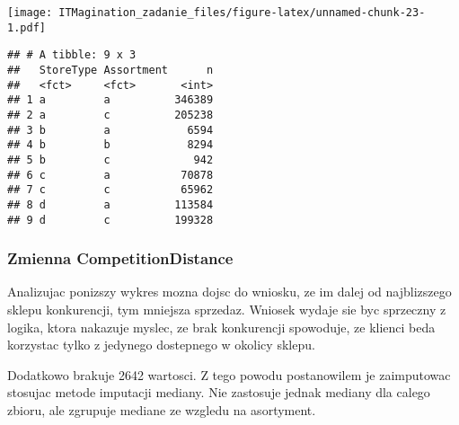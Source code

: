 \documentclass[]{article}
\newenvironment{Shaded}{\begin{snugshade}}{\end{snugshade}}
\newcommand{\DataTypeTok}[1]{\textcolor[rgb]{0.13,0.29,0.53}{#1}}
\newcommand{\FloatTok}[1]{\textcolor[rgb]{0.00,0.00,0.81}{#1}}
\newcommand{\KeywordTok}[1]{\textcolor[rgb]{0.13,0.29,0.53}{\textbf{#1}}}
\newcommand{\NormalTok}[1]{#1}
\newcommand{\OperatorTok}[1]{\textcolor[rgb]{0.81,0.36,0.00}{\textbf{#1}}}
\newcommand{\StringTok}[1]{\textcolor[rgb]{0.31,0.60,0.02}{#1}}
\begin{document}
\texttt{[image: ITMagination\_zadanie\_files/figure-latex/unnamed-chunk-23-1.pdf]}

\begin{Shaded}
\end{Shaded}

\begin{verbatim}
## # A tibble: 9 x 3
##   StoreType Assortment      n
##   <fct>     <fct>       <int>
## 1 a         a          346389
## 2 a         c          205238
## 3 b         a            6594
## 4 b         b            8294
## 5 b         c             942
## 6 c         a           70878
## 7 c         c           65962
## 8 d         a          113584
## 9 d         c          199328
\end{verbatim}

\hypertarget{zmienna-competitiondistance}{%
\subsubsection{Zmienna
CompetitionDistance}\label{zmienna-competitiondistance}}

Analizujac ponizszy wykres mozna dojsc do wniosku, ze im dalej od
najblizszego sklepu konkurencji, tym mniejsza sprzedaz. Wniosek wydaje
sie byc sprzeczny z logika, ktora nakazuje myslec, ze brak konkurencji
spowoduje, ze klienci beda korzystac tylko z jedynego dostepnego w
okolicy sklepu.

Dodatkowo brakuje 2642 wartosci. Z tego powodu postanowilem je
zaimputowac stosujac metode imputacji mediany. Nie zastosuje jednak
mediany dla calego zbioru, ale zgrupuje mediane ze wzgledu na
asortyment.

\begin{Shaded}
\end{Shaded}
\end{document}
